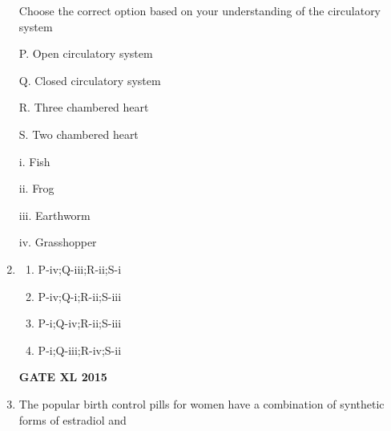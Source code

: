 \documentclass[journal,12pt,onecolumn]{IEEEtran}
\begin{document}
\begin{enumerate}
Choose the correct option based on your understanding of the circulatory system

	\begin{minipage}{0.5\textwidth}\begin{flushleft}
P. Open circulatory system

Q. Closed circulatory system

R. Three chambered heart

S. Two chambered heart
	\end{flushleft}
	\end{minipage}
	\begin{minipage}{0.5\textwidth}\begin{flushleft}
		i. Fish

		ii. Frog

		iii. Earthworm

		iv. Grasshopper

	\end{flushleft}
	\end{minipage}
\item 
    \begin{enumerate}
            \item P-iv;Q-iii;R-ii;S-i
            \item P-iv;Q-i;R-ii;S-iii
            \item P-i;Q-iv;R-ii;S-iii
            \item P-i;Q-iii;R-iv;S-ii
    \end{enumerate}
\begin{flushright}\textbf{GATE XL 2015}\end{flushright}
\item  The popular birth control pills for women have a combination of synthetic forms of estradiol and


\end{enumerate}
\end{document}
